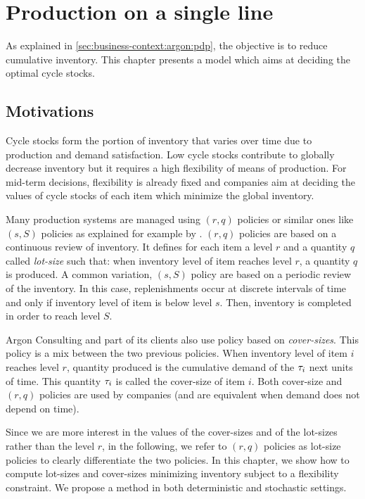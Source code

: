\chapter{Production on a single line}
\label{chap:lot-size:single-line}


As explained in \cref{sec:business-context:argon:pdp}, the objective is to reduce cumulative inventory.
This chapter presents a model which aims at deciding the optimal cycle stocks.



\section{Motivations}
\label{sec:lot-size:single-line:motivations}

Cycle stocks form the portion of inventory that varies over time due to production and demand satisfaction.
Low cycle stocks contribute to globally decrease inventory but it requires a high flexibility of means of production.
For mid-term decisions, flexibility is already fixed and companies aim at deciding the values of cycle stocks of each item which minimize the global inventory.


Many production systems are managed using $(r,q)$ policies or similar ones like $(s,S)$ policies as explained for example by \citet{Arrow1951}.
$(r,q)$ policies are based on a continuous review of inventory.
It defines for each item a level $r$ and a quantity $q$ called \emph{lot-size} such that: when inventory level of item reaches level $r$, a quantity $q$ is produced.
A common variation, $(s,S)$ policy are based on a periodic review of the inventory.
In this case, replenishments occur at discrete intervals of time and only if inventory level of item is below level $s$.
Then, inventory is completed in order to reach level $S$.


Argon Consulting and part of its clients also use policy based on \emph{cover-sizes}.
This policy is a mix between the two previous policies.
When inventory level of item $i$ reaches level $r$, quantity produced is the cumulative demand of the $\tau_i$ next units of time.
This quantity $\tau_i$ is called the cover-size of item $i$.
Both cover-size and $(r,q)$ policies are used by companies (and are equivalent when demand does not depend on time).


Since we are more interest in the values of the cover-sizes and of the lot-sizes rather than the level $r$, in the following, we refer to $(r,q)$ policies as lot-size policies to clearly differentiate the two policies.
In this chapter, we show how to compute lot-sizes and cover-sizes minimizing inventory subject to a flexibility constraint.
We propose a method in both deterministic and stochastic settings.


